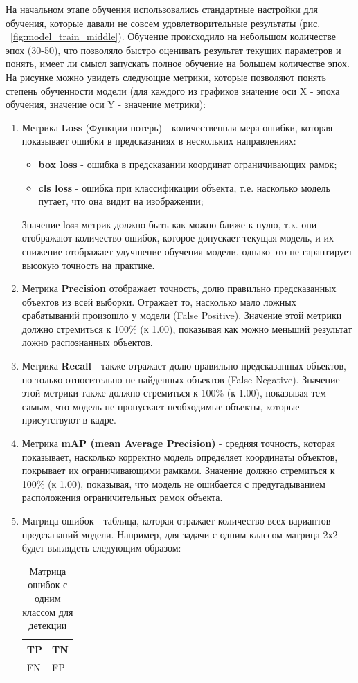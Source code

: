 \documentclass[a4paper,12pt]{article}
\begin{document}
На начальном этапе обучения использовались стандартные настройки для обучения, которые давали не совсем удовлетворительные результаты (рис. ~\ref{fig:model_train_middle}).
Обучение происходило на небольшом количестве эпох (30-50), что позволяло быстро оценивать результат текущих параметров и понять, имеет ли смысл запускать полное обучение на большем количестве эпох.   
На рисунке можно увидеть следующие метрики, которые позволяют понять степень обученности модели (для каждого из графиков значение оси X - эпоха обучения, значение оси Y - значение метрики):
\begin{enumerate}
    \item Метрика \textbf{Loss} (Функции потерь) - количественная мера ошибки, которая показывает ошибки в предсказаниях в нескольких направлениях:
    \begin{itemize}
        \item \textbf{box loss} - ошибка в предсказании координат ограничивающих рамок;
        \item \textbf{cls loss} - ошибка при классификации объекта, т.е. насколько модель путает, что она видит на изображении;
    \end{itemize}
    Значение loss метрик должно быть как можно ближе к нулю, т.к. они отображают количество ошибок, которое допускает текущая модель, и их снижение отображает улучшение обучения модели, однако это не гарантирует высокую точность на практике.
    \item Метрика \textbf{Precision} отображает точность, долю правильно предсказанных объектов из всей выборки. Отражает то, насколько мало ложных срабатываний произошло у модели (False Positive). Значение этой метрики должно стремиться к 100\% (к 1.00), показывая как можно меньший результат ложно распознанных объектов.
    \item Метрика \textbf{Recall} - также отражает долю правильно предсказанных объектов, но только относительно не найденных объектов (False Negative). Значение этой метрики также должно стремиться к 100\% (к 1.00), показывая тем самым, что модель не пропускает необходимые объекты, которые присутствуют в кадре.
    \item Метрика \textbf{mAP (mean Average Precision)} - средняя точность, которая показывает, насколько корректно модель определяет координаты объектов, покрывает их ограничивающими рамками. Значение должно стремиться к 100\% (к 1.00), показывая, что модель не ошибается с предугадыванием расположения ограничительных рамок объекта.

    \item Матрица ошибок - таблица, которая отражает количество всех вариантов предсказаний модели. Например, для задачи с одним классом матрица 2х2 будет выглядеть следующим образом:
    \begin{table}[H]
    \centering
    \begin{tabular}{|p{1cm}|p{1cm}|}
    \hline
    TP & TN \\ 
    \hline
    FN & FP \\ 
    \hline
    \end{tabular}
    \caption{Матрица ошибок с одним классом для детекции}
    \end{table}
 

\end{enumerate}
\end{document}

